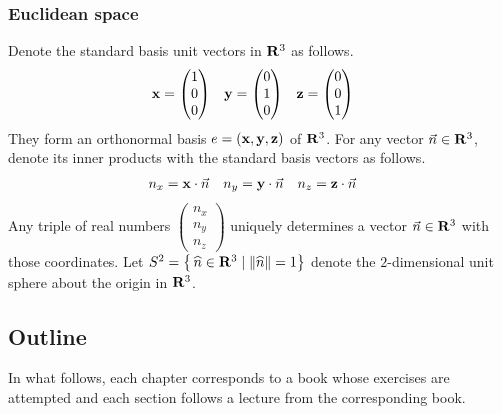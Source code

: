 \subsubsection{Euclidean space}
Denote the standard basis unit vectors in $\mathbf{R}^3$ as follows.
\begin{align*}
	\mathbf{x}     & =
	\begin{pmatrix}
		1 \\ 0 \\ 0
	\end{pmatrix}
	        &
	\mathbf{y}     & =
	\begin{pmatrix}
		0 \\ 1 \\ 0
	\end{pmatrix}
	        &
	\mathbf{z} & =
	\begin{pmatrix}
		0 \\ 0 \\ 1
	\end{pmatrix}
\end{align*}
They form an orthonormal basis $e = (\mathbf{x}, \mathbf{y}, \mathbf{z})$ of $\mathbf{R}^3$.
For any vector $\vec{n} \in \mathbf{R}^3$, denote its inner products with the standard basis vectors as follows.
\begin{align*}
	n_x & = \mathbf{x} \cdot \vec{n}
	    &
	n_y & = \mathbf{y} \cdot \vec{n}
	    &
	n_z & = \mathbf{z} \cdot \vec{n}
\end{align*}
Any triple of real numbers $\begin{pmatrix} n_x \\ n_y \\ n_z\end{pmatrix}$ uniquely determines a vector $\vec{n} \in \mathbf{R}^3$ with those coordinates.
Let $S^2 = \left\{\, \widehat{n} \in \mathbf{R}^3 \mid \|\widehat{n}\| = 1\right\}$ denote the $2$-dimensional unit sphere about the origin in $\mathbf{R}^3$.

\subsection{Outline}

In what follows, each chapter corresponds to a book whose exercises are attempted and each section follows a lecture from the corresponding book.

